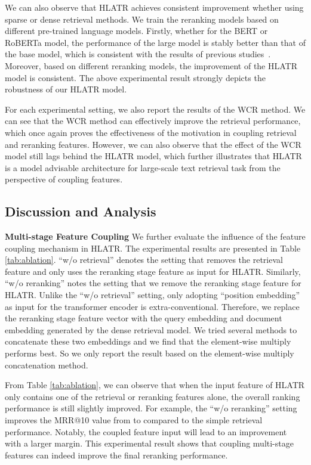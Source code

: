\documentclass[11pt]{article}
\begin{document}
We can also observe that HLATR achieves consistent improvement whether using sparse or dense retrieval methods. We train the reranking models based on different pre-trained language models. Firstly, whether for the BERT or RoBERTa model, the performance of the large model is stably better than that of the base model, which is consistent with the results of previous studies~\cite{gao2021rethink,ma2021b}. Moreover, based on different reranking models, the improvement of the HLATR model is consistent. The above experimental result strongly depicts the robustness of our HLATR model. 

For each experimental setting, we also report the results of the WCR method. We can see that the WCR method can effectively improve the retrieval performance, which once again proves the effectiveness of the motivation in coupling retrieval and reranking features. However, we can also observe that the effect of the WCR model still lags behind the HLATR model, which further illustrates that HLATR is a model advisable architecture for large-scale text retrieval task from the perspective of coupling features.

\subsection{Discussion and Analysis}
\label{sec:discussion}

\noindent \textbf{Multi-stage Feature Coupling} We further evaluate the influence of the feature coupling mechanism in HLATR. The experimental results are presented in Table \ref{tab:ablation}. ``w/o retrieval'' denotes the setting that removes the retrieval feature and only uses the reranking stage feature as input for HLATR. Similarly, ``w/o reranking'' notes the setting that we remove the reranking stage feature for HLATR. Unlike the ``w/o retrieval'' setting, only adopting ``position embedding'' as input for the transformer encoder is extra-conventional. Therefore, we replace the reranking stage feature vector with the query embedding and document embedding generated by the dense retrieval model. We tried several methods to concatenate these two embeddings and we find that the element-wise multiply performs best. So we only report the result based on the element-wise multiply concatenation method. 

From Table \ref{tab:ablation}, we can observe that when the input feature of HLATR only contains one of the retrieval or reranking features alone, the overall ranking performance is still slightly improved. For example, the ``w/o reranking'' setting improves the MRR@10 value from  to  compared to the simple retrieval performance. Notably, the coupled feature input will lead to an improvement with a larger margin. This experimental result shows that coupling multi-stage features can indeed improve the final reranking performance.
\end{document}
